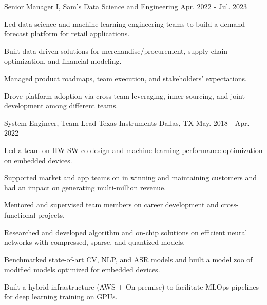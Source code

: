 \begin{cventries}
	\cventry
		{Senior Manager I, Sam's Data Science and Engineering} %
		{} %
		{} %
		{Apr. 2022 - Jul. 2023} %
		{
			\begin{cvitems} %
				\item {Led data science and machine learning engineering teams to build a demand 
				forecast platform for retail applications.}
				\item {Built data driven solutions for merchandise/procurement, supply chain 
				optimization, and financial modeling.}
				\item {Managed product roadmaps, team execution, and stakeholders' expectations.}
				\item {Drove platform adoption via cross-team leveraging, inner sourcing, and 
				joint development among different teams.}
			\end{cvitems}
	}

\cventry
{System Engineer, Team Lead} %
{Texas Instruments} %
{Dallas, TX} %
{May. 2018 - Apr. 2022} %
{
		\begin{cvitems} %
			\item {Led a team on HW-SW co-design and machine learning performance optimization 
			on embedded devices.}
			\item {Supported market and app teams on in winning and maintaining customers and had 
			an impact on generating multi-million revenue.}
			\item {Mentored and supervised team members on career development and cross-functional projects.}
			\item {Researched and developed algorithm and on-chip solutions on efficient neural 
			networks with compressed, sparse, and quantized models.}
			\item {Benchmarked state-of-art CV, NLP, and ASR models and built a model zoo of 
			modified models optimized for embedded devices.}
			\item {Built a hybrid infrastructure (AWS + On-premise) to facilitate MLOps 
			pipelines for deep learning training on GPUs.}
		\end{cvitems}
}



\end{cventries}
